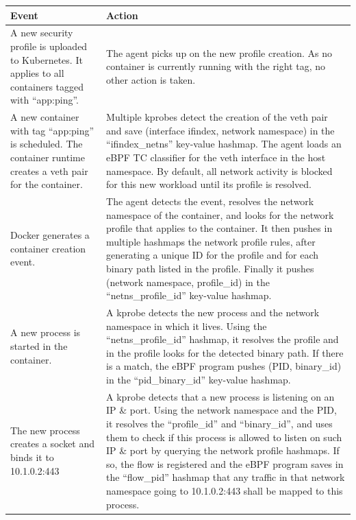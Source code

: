 \begin{table}[p]
  \setlength{\tabcolsep}{5pt}
  \def\arraystretch{1.5}
  \begin{tabular}{|p{}|p{}|}
    \hline \centering Event & \centering Action \tabularnewline

    \hline A new security profile is uploaded to Kubernetes. It applies to all containers tagged with “app:ping”. & The agent picks up on the new profile creation. As no container is currently running with the right tag, no other action is taken. \\

    \hline A new container with tag “app:ping” is scheduled. The container runtime creates a veth pair for the container. & Multiple kprobes detect the creation of the veth pair and save (interface ifindex, network namespace) in the “ifindex\_netns” key-value hashmap. The agent loads an eBPF TC classifier for the veth interface in the host namespace. By default, all network activity is blocked for this new workload until its profile is resolved. \\

    \hline Docker generates a container creation event. & The agent detects the event, resolves the network namespace of the container, and looks for the network profile that applies to the container. It then pushes in multiple hashmaps the network profile rules, after generating a unique ID for the profile and for each binary path listed in the profile. Finally it pushes (network namespace, profile\_id) in the “netns\_profile\_id” key-value hashmap. \\

    \hline A new process is started in the container. & A kprobe detects the new process and the network namespace in which it lives. Using the “netns\_profile\_id” hashmap, it resolves the profile and in the profile looks for the detected binary path. If there is a match, the eBPF program pushes (PID, binary\_id) in the “pid\_binary\_id” key-value hashmap. \\

    \hline The new process creates a socket and binds it to 10.1.0.2:443 & A kprobe detects that a new process is listening on an IP \& port. Using the network namespace and the PID, it resolves the “profile\_id” and “binary\_id”, and uses them to check if this process is allowed to listen on such IP \& port by querying the network profile hashmaps. If so, the flow is registered and the eBPF program saves in the “flow\_pid” hashmap that any traffic in that network namespace going to 10.1.0.2:443 shall be mapped to this process. \\

    \hline
  \end{tabular}
\end{table}

